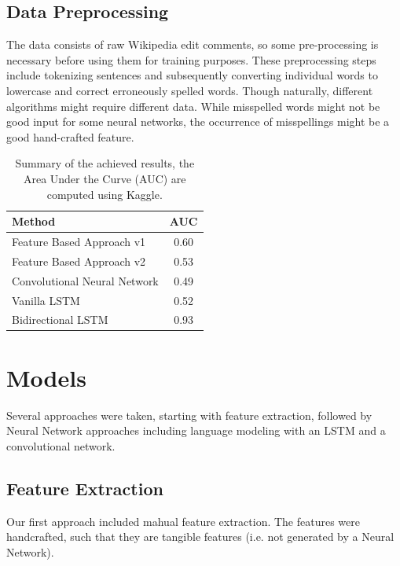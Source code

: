 \documentclass[10pt, a4paper]{article}
\begin{document}
	\begin{multicols}{2}
		
		
		\subsection*{Data Preprocessing}
		The data consists of raw Wikipedia edit comments, so some pre-processing is necessary before using them for training purposes. These preprocessing steps include tokenizing sentences and subsequently converting individual words to lowercase and correct erroneously spelled words. Though  naturally, different algorithms might require different data. While misspelled words might not be good input for some neural networks, the occurrence of misspellings might be a good hand-crafted feature.
		
		\begin{table}[t]
			\centering
			\begin{tabular}{l|c}
				\toprule
				\textbf{Method} & \textbf{AUC} \\
				\midrule
				Feature Based Approach v1 & 0.60   \\
				Feature Based Approach v2 & 0.53 \\
				Convolutional Neural Network & 0.49 \\
				Vanilla LSTM & 0.52 \\
				Bidirectional LSTM & 0.93 \\
				\bottomrule
			\end{tabular}
			\caption{Summary of the achieved results, the Area Under the Curve (AUC) are computed using Kaggle.}
			\label{table:summary_results}
		\end{table}
		
		
		\section{Models}
		Several approaches were taken, starting with feature extraction, followed by Neural Network approaches including language modeling with an LSTM and a convolutional network.
		
		\subsection{Feature Extraction}
		Our first approach included mahual feature extraction. The features were handcrafted, such that they are tangible features (i.e. not generated by a Neural Network).

\end{multicols}
\end{document}
